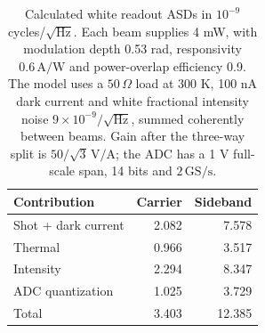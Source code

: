 \begin{table}[t]
\centering
\caption{Calculated white readout ASDs in $10^{-9}$ cycles/$\sqrt{\mathrm{Hz}}$. Each beam supplies 4 mW, with modulation depth 0.53 rad, responsivity $0.6\,\mathrm{A/W}$ and power-overlap efficiency 0.9. The model uses a $50\,\Omega$ load at 300 K, 100 nA dark current and white fractional intensity noise $9\times10^{-9}/\sqrt{\mathrm{Hz}}$, summed coherently between beams. Gain after the three-way split is $50/\sqrt{3}\,\mathrm{V/A}$; the ADC has a 1 V full-scale span, 14 bits and $2\,\mathrm{GS/s}$.}
\label{tab:readout_components}
\begin{tabular}{lrr}
\hline
Contribution & Carrier & Sideband \\
\hline
Shot + dark current & 2.082 & 7.578 \\
Thermal & 0.966 & 3.517 \\
Intensity & 2.294 & 8.347 \\
ADC quantization & 1.025 & 3.729 \\
Total & 3.403 & 12.385 \\
\hline
\end{tabular}
\end{table}
